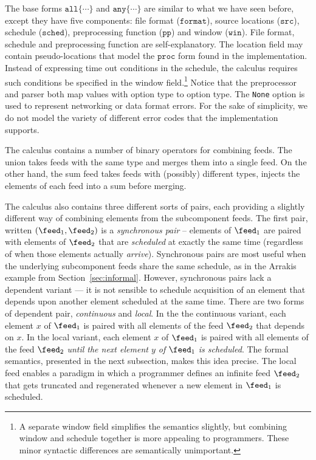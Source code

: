 The base forms $\mathtt{all \{ \cdots \}}$ and $\mathtt{any \{ \cdots \}}$
are similar to what we have seen before, except they have five components:
file format ($\mathtt{format}$), source locations ($\mathtt{src}$), 
schedule ($\mathtt{sched}$), preprocessing function ($\mathtt{pp}$) 
and window ($\mathtt{win}$).
File format, schedule and preprocessing function are self-explanatory.
The location field may contain pseudo-locations that 
model the $\mathtt{proc}$ form found in the implementation.
Instead of expressing time out conditions in the schedule,
the calculus requires such conditions be specified in the window 
field.\footnote{A separate window field simplifies the semantics slightly,
but combining window and schedule together is more appealing to
programmers.  These minor syntactic differences are semantically unimportant.} 
Notice that the preprocessor
and parser both map values with option type to option type.
The {\tt None} option is used to represent networking or data format
errors.  For the sake of simplicity, 
we do not model the variety of different error codes that
the implementation supports. 

The calculus contains a number of binary operators for combining
feeds.  The union takes feeds with the same type and merges them
into a single feed.  On the other hand, the sum feed takes feeds
with (possibly) different types, injects the elements of each feed into
a sum before merging.  

The calculus also contains three different
sorts of pairs, each providing a slightly different way of
combining elements from the subcomponent feeds.  The first pair, 
written $(\feed_1, \feed_2)$ is a {\em synchronous pair} -- 
elements of $\feed_1$ are paired with elements of $\feed_2$
that are {\em scheduled} at exactly the same time (regardless of when those elements
actually {\em arrive}).  Synchronous pairs are most useful when the underlying
subcomponent feeds share the same schedule, as in the Arrakis example
from Section~\ref{sec:informal}.  However, synchronous pairs lack a
dependent variant --- it is not sensible to schedule acquisition of an element
that depends upon another element scheduled at the same time.
There are two forms of dependent pair, {\em continuous} and {\em local}.
In the the continuous variant, each element $x$ of $\feed_1$ is paired 
with all elements of the feed $\feed_2$ that depends on $x$.  In the
local variant, each element $x$ of $\feed_1$
is paired with all elements of the feed $\feed_2$ {\em until the next
element $y$ of $\feed_1$ is scheduled}.  The formal semantics, presented
in the next subsection, makes this idea precise.  The local feed
enables a paradigm in which a programmer defines an infinite feed $\feed_2$
that gets truncated and regenerated whenever a new element in $\feed_1$
is scheduled.

